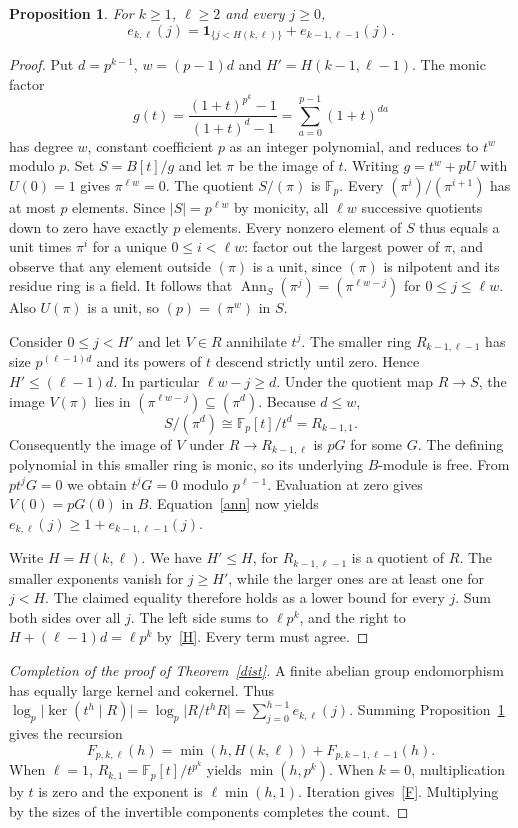 \documentclass[11pt,letterpaper]{article}
\newtheorem{proposition}[theorem]{Proposition}
\newcommand{\F}{\mathbb F}
\newcommand{\card}[1]{\lvert #1\rvert}
\newcommand{\ind}{\mathbf1}
\begin{document}
\begin{proposition}\label{rec}
For $k\ge1$, $\ell\ge2$ and every $j\ge0$,
\[
 e_{k,\ell}(j)=\ind_{\{j<H(k,\ell)\}}+e_{k-1,\ell-1}(j).
\]
\end{proposition}
\begin{proof}
Put $d=p^{k-1}$, $w=(p-1)d$ and $H'=H(k-1,\ell-1)$. The monic factor
\[
 g(t)=\frac{(1+t)^{p^k}-1}{(1+t)^d-1}=\sum_{a=0}^{p-1}(1+t)^{da}
\]
has degree $w$, constant coefficient $p$ as an integer polynomial, and
reduces to $t^w$ modulo $p$. Set $S=B[t]/g$ and let $\pi$ be the image of
$t$. Writing $g=t^w+pU$ with $U(0)=1$ gives $\pi^{\ell w}=0$.
The quotient $S/(\pi)$ is $\F_p$. Every $(\pi^i)/(\pi^{i+1})$ has at most
$p$ elements. Since $\card{S}=p^{\ell w}$ by monicity, all $\ell w$
successive quotients down to zero have exactly $p$ elements. Every nonzero
element of $S$ thus equals a unit times $\pi^i$ for a unique $0\le i<\ell w$:
factor out the largest power of $\pi$, and observe that any element outside
$(\pi)$ is a unit, since $(\pi)$ is nilpotent and its residue ring is a
field. It follows that $\operatorname{Ann}_S(\pi^j)=(\pi^{\ell w-j})$
for $0\le j\le\ell w$. Also $U(\pi)$ is a unit, so $(p)=(\pi^w)$ in $S$.

Consider $0\le j<H'$ and let $V\in R$ annihilate $t^j$. The smaller
ring $R_{k-1,\ell-1}$ has size $p^{(\ell-1)d}$ and its powers of $t$ descend
strictly until zero. Hence $H'\le(\ell-1)d$. In particular $\ell w-j\ge d$.
Under the quotient map $R\to S$, the image $V(\pi)$ lies in
$(\pi^{\ell w-j})\subseteq(\pi^d)$. Because $d\le w$,
\[
 S/(\pi^d)\cong\F_p[t]/t^d=R_{k-1,1}.
\]
Consequently the image of $V$ under $R\to R_{k-1,\ell}$ is $pG$ for some
$G$. The defining polynomial in this smaller ring is monic, so its
underlying $B$-module is free. From $pt^jG=0$ we obtain $t^jG=0$ modulo
$p^{\ell-1}$. Evaluation at zero gives $V(0)=pG(0)$ in $B$.
Equation~\eqref{ann} now yields $e_{k,\ell}(j)\ge1+e_{k-1,\ell-1}(j)$.

Write $H=H(k,\ell)$. We have $H'\le H$, for $R_{k-1,\ell-1}$ is a quotient
of $R$. The smaller exponents vanish for $j\ge H'$, while the larger ones
are at least one for $j<H$. The claimed equality therefore holds as a
lower bound for every $j$. Sum both sides over all $j$. The left side sums
to $\ell p^k$, and the right to $H+(\ell-1)d=\ell p^k$ by~\eqref{H}.
Every term must agree.
\end{proof}

\begin{proof}[Completion of the proof of Theorem~\ref{dist}]
A finite abelian group endomorphism has equally large kernel and cokernel. Thus
$\log_p\card{\ker(t^h\mid R)}=\log_p\card{R/t^hR}=\sum_{j=0}^{h-1}e_{k,\ell}(j)$.
Summing Proposition~\ref{rec} gives the recursion
\[
 F_{p,k,\ell}(h)=\min(h,H(k,\ell))+F_{p,k-1,\ell-1}(h).
\]
When $\ell=1$, $R_{k,1}=\F_p[t]/t^{p^k}$ yields
$\min(h,p^k)$. When $k=0$, multiplication by $t$ is zero and the exponent
is $\ell\min(h,1)$. Iteration gives~\eqref{F}. Multiplying by the sizes of
the invertible components completes the count.
\end{proof}
\end{document}
